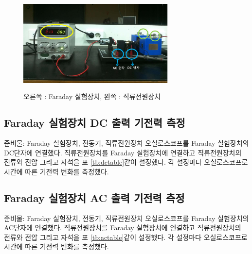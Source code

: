 \documentclass[a4paper]{article}
\begin{document}
	\begin{figure}[h]
		\centering
		\includegraphics[width=0.7\textwidth]{img/exp1.PNG}
		\label{fig:exp1}
		\caption{오른쪽 : Faraday 실험장치, 왼쪽 : 직류전원장치}
	\end{figure}

	\subsection{Faraday 실험장치 DC 출력 기전력 측정}
	준비물: Faraday 실험장치, 전동기, 직류전원장치
	오실로스코프를 Faraday 실험장치의 DC단자에 연결했다.
	직류전원장치를 Faraday 실험장치에 연결하고 직류전원장치의 전류와 전압 그리고 자석을 표 \ref{tb:dctable}같이 설정했다.
	각 설정마다 오실로스코프로 시간에 따른 기전력 변화를 측정했다.
	
	\subsection{Faraday 실험장치 AC 출력 기전력 측정}
	준비물: Faraday 실험장치, 전동기, 직류전원장치
	오실로스코프를 Faraday 실험장치의 AC단자에 연결했다.
	직류전원장치를 Faraday 실험장치에 연결하고 직류전원장치의 전류와 전압 그리고 자석을 표 \ref{tb:actable}같이 설정했다.
	각 설정마다 오실로스코프로 시간에 따른 기전력 변화를 측정했다.
	
\end{document}
